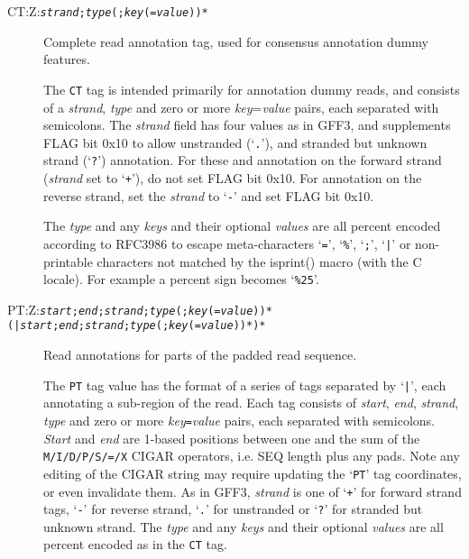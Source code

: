 \documentclass[10pt]{article}
\newcommand{\tagregex}[1]{\tt #1}
\begin{document}
\begin{description}
\item[CT:Z:\tagregex{\emph{strand};\emph{type}(;\emph{key}(=\emph{value}))*}]
Complete read annotation tag, used for consensus annotation dummy features.

The {\tt CT} tag is intended primarily for annotation
dummy reads, and consists of a \emph{strand}, \emph{type} and zero or
more \emph{key}=\emph{value} pairs, each separated with semicolons.
The \emph{strand} field has four values as in GFF3, and supplements FLAG
bit 0x10 to allow unstranded (`{\tt .}'), and stranded but unknown strand
(`{\tt ?}') annotation. For these and annotation on the forward strand
(\emph{strand} set to `{\tt +}'), do not set FLAG bit 0x10. For
annotation on the reverse strand, set the \emph{strand} to `{\tt -}'
and set FLAG bit 0x10.

The \emph{type} and any \emph{keys} and their
optional \emph{values} are all percent encoded according to
RFC3986 to escape meta-characters `{\tt =}', `{\tt \%}', `{\tt ;}',
`{\tt |}' or non-printable characters not matched by the isprint()
macro (with the C locale). For example a percent sign becomes
`{\tt \%25}'.

\item[PT:Z:\tagregex{\tt \emph{start};\emph{end};\emph{strand};\emph{type}(;\emph{key}(=\emph{value}))*(\char92|\emph{start};\emph{end};\emph{strand};\emph{type}(;\emph{key}(=\emph{value}))*)*}]
Read annotations for parts of the padded read sequence.

The {\tt PT} tag value has the format of a series of
tags separated by `{\tt |}', each annotating a sub-region of the read.
Each tag consists of \emph{start}, \emph{end}, \emph{strand},
\emph{type} and zero or more \emph{key}{\tt =}\emph{value} pairs, each
separated with semicolons. \emph{Start} and \emph{end} are 1-based
positions between one and the sum of the {\tt M/I/D/P/S/=/X}
{\sf CIGAR} operators, i.e. {\sf SEQ} length plus any pads.  Note
any editing of the CIGAR string may require updating the `{\tt PT}'
tag coordinates, or even invalidate them.
As in GFF3, \emph{strand} is one of `{\tt +}' for forward strand tags,
`{\tt -}' for reverse strand, `{\tt .}' for unstranded or `{\tt ?}'
for stranded but unknown strand.
The \emph{type} and any \emph{keys} and their optional \emph{values}
are all percent encoded as in the {\tt CT} tag.
\end{description}
\end{document}

